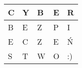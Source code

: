 \begin{table}[]
\begin{tabular}{|l|l|l|l|l|}
\hline
C & Y & B & E & R  \\ \hline
B & E & Z & P & I  \\ \hline
E & C & Z & E & Ń  \\ \hline
S & T & W & O & :) \\ \hline
\end{tabular}
\end{table}
